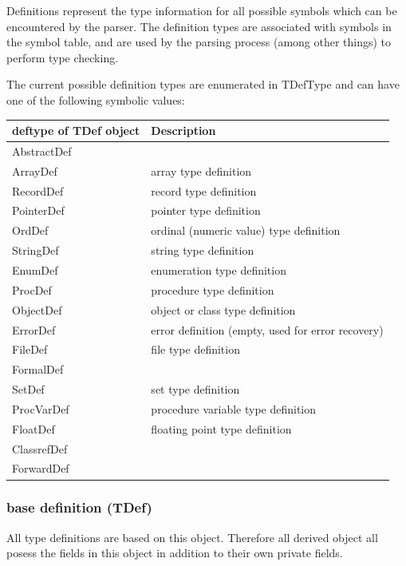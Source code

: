 \documentclass [a4paper,12pt]{article}
\begin{document}
Definitions represent the type information for all possible symbols which
can be encountered by the parser. The definition types are associated with
symbols in the symbol table, and are used by the parsing process (among
other things) to perform type checking.

The current possible definition types are enumerated in \textsf{TDefType}
and can have one of the following symbolic values:

\begin{longtable}{|l|p{10cm}|}
\hline
deftype of TDef object  & Description \\
\hline
\endhead
\hline
\endfoot
\textsf{AbstractDef}    &  \\
\textsf{ArrayDef}   & array type definition \\
\textsf{RecordDef}  & record type definition \\
\textsf{PointerDef} & pointer type definition \\
\textsf{OrdDef}     & ordinal (numeric value) type definition \\
\textsf{StringDef}  & string type definition \\
\textsf{EnumDef}    & enumeration type definition \\
\textsf{ProcDef}    & procedure type definition \\
\textsf{ObjectDef}  & object or class type definition \\
\textsf{ErrorDef}   & error definition (empty, used for error recovery) \\
\textsf{FileDef}    & file type definition \\
\textsf{FormalDef}  &  \\
\textsf{SetDef}     & set type definition \\
\textsf{ProcVarDef} & procedure variable type definition \\
\textsf{FloatDef}   & floating point type definition \\
\textsf{ClassrefDef}    &  \\
\textsf{ForwardDef} &  \\
\end{longtable}

\subsubsection{base definition (TDef)}
\label{subsubsec:mylabel5}

All type definitions are based on this object. Therefore all derived object
all posess the fields in this object in addition to their own private
fields.
\end{document}
